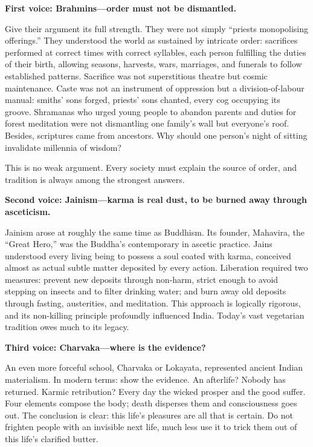 \textbf{First voice: Brahmins---order must not be dismantled.}

Give their argument its full strength. They were not simply ``priests monopolising offerings.'' They understood the world as sustained by intricate order: sacrifices performed at correct times with correct syllables, each person fulfilling the duties of their birth, allowing seasons, harvests, wars, marriages, and funerals to follow established patterns. Sacrifice was not superstitious theatre but cosmic maintenance. Caste was not an instrument of oppression but a division-of-labour manual: smiths' sons forged, priests' sons chanted, every cog occupying its groove. Shramanas who urged young people to abandon parents and duties for forest meditation were not dismantling one family's wall but everyone's roof. Besides, scriptures came from ancestors. Why should one person's night of sitting invalidate millennia of wisdom?

This is no weak argument. Every society must explain the source of order, and tradition is always among the strongest answers.

\textbf{Second voice: Jainism---karma is real dust, to be burned away through asceticism.}

Jainism arose at roughly the same time as Buddhism. Its founder, Mahavira, the ``Great Hero,'' was the Buddha's contemporary in ascetic practice. Jains understood every living being to possess a soul coated with karma, conceived almost as actual subtle matter deposited by every action. Liberation required two measures: prevent new deposits through non-harm, strict enough to avoid stepping on insects and to filter drinking water; and burn away old deposits through fasting, austerities, and meditation. This approach is logically rigorous, and its non-killing principle profoundly influenced India. Today's vast vegetarian tradition owes much to its legacy.

\textbf{Third voice: Charvaka---where is the evidence?}

An even more forceful school, Charvaka or Lokayata, represented ancient Indian materialism. In modern terms: show the evidence. An afterlife? Nobody has returned. Karmic retribution? Every day the wicked prosper and the good suffer. Four elements compose the body; death disperses them and consciousness goes out. The conclusion is clear: this life's pleasures are all that is certain. Do not frighten people with an invisible next life, much less use it to trick them out of this life's clarified butter.

